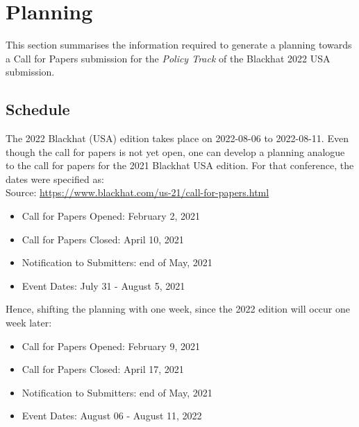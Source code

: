 \section{Planning}
\label{sec:planning}
This section summarises the information required to generate a planning towards a Call for Papers submission for the \textit{Policy Track} of the Blackhat 2022 USA submission.


\subsection{Schedule}
The 2022 Blackhat (USA) edition takes place on 2022-08-06 to 2022-08-11. Even though the call for papers is not yet open, one can develop a planning analogue to the call for papers for the 2021 Blackhat USA edition. For that conference, the dates were specified as:\\
Source: \url{https://www.blackhat.com/us-21/call-for-papers.html}
\begin{itemize}
	\item Call for Papers Opened: February 2, 2021
	\item Call for Papers Closed: April 10, 2021
	\item Notification to Submitters: end of May, 2021
	\item Event Dates: July 31 - August 5, 2021
\end{itemize}
Hence, shifting the planning with one week, since the 2022 edition will occur one week later:
\begin{itemize}
	\item Call for Papers Opened: February 9, 2021
	\item Call for Papers Closed: April 17, 2021
	\item Notification to Submitters: end of May, 2021
	\item Event Dates: August 06 - August 11, 2022
\end{itemize}

